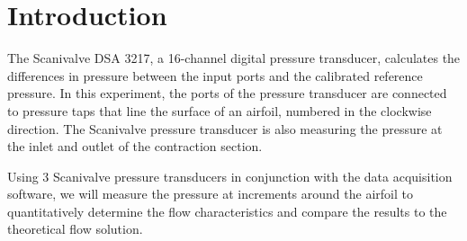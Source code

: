 \chapter{Introduction}
\label{cp:introduction}
The Scanivalve DSA 3217, a 16-channel digital pressure transducer, calculates the differences in pressure between the input ports and the calibrated reference pressure. In this experiment, the ports of the pressure transducer are connected to pressure taps that line the surface of an airfoil, numbered in the clockwise direction. The Scanivalve pressure transducer is also measuring the pressure at the inlet and outlet of the contraction section.

Using 3 Scanivalve pressure transducers in conjunction with the data acquisition software, we will measure the pressure at  increments around the airfoil to quantitatively determine the flow characteristics and compare the results to the theoretical flow solution.